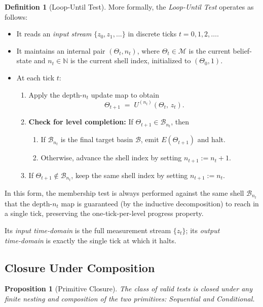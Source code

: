 \documentclass[12pt]{article}
\theoremstyle{definition}
\newtheorem{definition}{Definition}[section]
\theoremstyle{plain}
\newtheorem{proposition}{Proposition}[section]
\begin{document}
\begin{definition}[Loop‑Until Test]
More formally, the \emph{Loop-Until Test} operates as follows:
\begin{itemize}
  \item It reads an \emph{input stream} $\{z_0,z_1,\dots\}$ in discrete ticks $t=0,1,2,\dots$.
  \item It maintains an internal pair $(\Theta_t,n_t)$, where $\Theta_t\in\mathcal M$ is the current belief-state and $n_t\in\mathbb N$ is the current shell index, initialized to $(\Theta_0,1)$.
  \item At each tick $t$:
    \begin{enumerate}
      \item Apply the depth-$n_t$ update map to obtain
      \[
         \Theta_{t+1} \;=\; U^{(n_t)}(\Theta_t,\,z_t).
      \]
      \item \textbf{Check for level completion:} If $\Theta_{t+1}\in\mathcal B_{n_t}$, then
        \begin{enumerate}
          \item If $\mathcal B_{n_t}$ is the final target basin $\mathcal B$, emit $E(\Theta_{t+1})$ and halt.
          \item Otherwise, advance the shell index by setting $n_{t+1} := n_t+1$.
        \end{enumerate}
      \item If $\Theta_{t+1}\notin\mathcal B_{n_t}$, keep the same shell index by setting $n_{t+1} := n_t$.
    \end{enumerate}
\end{itemize}
In this form, the membership test is always performed against the same shell $\mathcal B_{n_t}$ that the depth-$n_t$ map is guaranteed (by the inductive decomposition) to reach in a single tick, preserving the one-tick-per-level progress property.

Its \emph{input time‑domain} is the full measurement stream \(\{z_t\}\); its \emph{output time‑domain} is exactly the single tick at which it halts.
\end{definition}


\subsection{Closure Under Composition}

\begin{proposition}[Primitive Closure]
\label{prop:primitive-closure}
The class of valid tests is closed under any finite nesting and composition of the two primitives: Sequential and Conditional.
\end{proposition}
\end{document}
